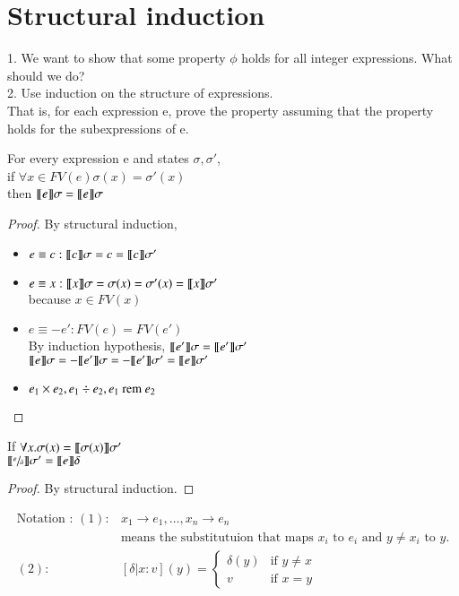 \documentclass{report}[12pt]
\begin{document}
\section{Structural induction}
1. We want to show that some property $\phi$ holds for all integer expressions. What should we do? \\
2. Use induction on the structure of expressions. \\
That is, for each expression e, prove the property assuming that the property holds for the subexpressions of e.
\begin{lemma}[Coincidence]
    For every expression e and states $\sigma, \sigma'$, \\
    if $\forall x\in FV(e) \sigma(x) = \sigma'(x) $ \\
    then $\llbracket  e  \rrbracket \sigma = \llbracket  e  \rrbracket \sigma$
\end{lemma}
\begin{proof}
    By structural induction,
    \begin{itemize}
        \item $e \equiv c : \llbracket  c  \rrbracket \sigma = c =  \llbracket  c  \rrbracket \sigma' $
        \item $e \equiv x : \llbracket  x  \rrbracket \sigma = \sigma(x) = \sigma'(x) = \llbracket  x  \rrbracket \sigma'$ \\
        because $x \in FV(x)$
        \item $e \equiv -e' : FV(e) = FV(e')$ \\
        By induction hypothesis, $\llbracket  e'  \rrbracket \sigma = \llbracket  e'  \rrbracket \sigma'$ \\
        $\llbracket  e  \rrbracket \sigma = - \llbracket  e'  \rrbracket \sigma = - \llbracket  e'  \rrbracket \sigma' = \llbracket  e  \rrbracket \sigma'$
        \item $e_1 \times e_2, e_1 \div e_2, e_1\text{ rem } e_2$
    \end{itemize}
\end{proof}
\begin{lemma}[Substitution]
    If $\forall x. \sigma(x) = \llbracket  \sigma(x)  \rrbracket \sigma' $ \\
    $\llbracket  \sfrac{e}{\delta}  \rrbracket \sigma' = \llbracket  e  \rrbracket \delta$
\end{lemma}
\begin{proof}
    By structural induction.
\end{proof}
\begin{align*}
    \text{Notation : }(1) : &x_1 \rightarrow e_1, \ldots, x_n \rightarrow e_n \\
    &\text{means the substitutuion that maps } x_i \text{ to }e_i \text{ and }y\neq x_i \text{ to } y. \\
    (2) : &[\delta | x:v] (y) = \begin{cases} \delta(y) & \text{if }y\neq x \\ v &\text{if }x=y\end{cases}
\end{align*}
\end{document}
